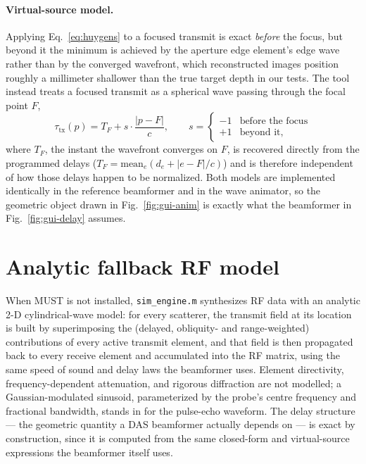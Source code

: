 \documentclass[11pt]{article}
\newcommand{\code}[1]{\texttt{#1}}
\newcommand{\must}{MUST}
\begin{document}
\paragraph{Virtual-source model.} Applying Eq.~\eqref{eq:huygens} to a
focused transmit is exact \emph{before} the focus, but beyond it the
minimum is achieved by the aperture edge element's edge wave rather than by
the converged wavefront, which reconstructed images position roughly a
millimeter shallower than the true target depth in our tests. The tool
instead treats a focused transmit as a spherical wave passing through the
focal point $F$,
\begin{equation}
  \tau_{\mathrm{tx}}(p) = T_F + s \cdot \frac{|p - F|}{c}, \qquad
  s = \begin{cases} -1 & \text{before the focus} \\ +1 & \text{beyond it,} \end{cases}
  \label{eq:vsource}
\end{equation}
where $T_F$, the instant the wavefront converges on $F$, is recovered
directly from the programmed delays ($T_F = \mathrm{mean}_e(d_e + |e-F|/c)$)
and is therefore independent of how those delays happen to be normalized.
Both models are implemented identically in the reference beamformer and in
the wave animator, so the geometric object drawn in Fig.~\ref{fig:gui-anim}
is exactly what the beamformer in Fig.~\ref{fig:gui-delay} assumes.

\section{Analytic fallback RF model}
\label{sec:mock}

When \must{} is not installed, \code{sim\_engine.m} synthesizes RF data with
an analytic 2-D cylindrical-wave model: for every scatterer, the transmit
field at its location is built by superimposing the (delayed, obliquity- and
range-weighted) contributions of every active transmit element, and that
field is then propagated back to every receive element and accumulated into
the RF matrix, using the same speed of sound and delay laws the beamformer
uses. Element directivity, frequency-dependent attenuation, and rigorous
diffraction are not modelled; a Gaussian-modulated sinusoid, parameterized
by the probe's centre frequency and fractional bandwidth, stands in for the
pulse-echo waveform. The delay structure --- the geometric quantity a DAS
beamformer actually depends on --- is exact by construction, since it is
computed from the same closed-form and virtual-source expressions the
beamformer itself uses.
\end{document}
